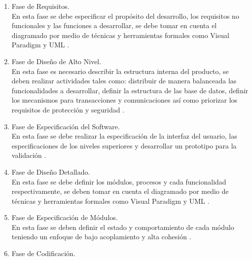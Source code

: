 \documentclass[runningheads,a4paper]{llncs}
\begin{document}
\begin{enumerate}
	\item Fase de Requisitos.\\
	
En esta fase se debe especificar el propósito del desarrollo, los requisitos no funcionales y 			  las funciones a desarrollar, se debe tomar en cuenta el diagramado por medio de técnicas y 				 	herramientas formales como \gls{Visual Paradigm} y \gls{UML} \cite{CbyCBrito}.\\
		  
		  \item Fase de Diseño de Alto Nivel.\\
		  
En esta fase es necesario describir la estructura interna del producto, se deben realizar 					  actividades tales como: distribuir de manera balanceada las funcionalidades a desarrollar, definir 			la estructura de las base de datos, definir los mecanismos para transacciones y comunicaciones así como priorizar los requisitos de protección y seguridad \cite{CbyCBrito}.\\
		  
		  \item Fase de Especificación del \gls{Software}.\\
		  
En esta fase se debe realizar la especificación de la interfaz del usuario, las especificaciones de los 		niveles superiores y desarrollar un prototipo para la validación \cite{CbyCBrito}.\\
		  
		  \item Fase de Diseño Detallado.\\
		  
En esta fase se debe definir los módulos, procesos y cada funcionalidad respectivamente, se deben tomar 		en cuenta el diagramado por medio de técnicas y herramientas formales como \gls{Visual Paradigm} y 			\gls{UML} \cite{CbyCBrito}.\\
		  
		  \item Fase de Especificación de Módulos.\\
		  
En esta fase se deben definir el estado y comportamiento de cada módulo teniendo un enfoque de bajo 			acoplamiento y alta cohesión \cite{CbyCBrito}.\\
		  
		  \item Fase de Codificación.\\
		  

\end{enumerate}
\end{document}
